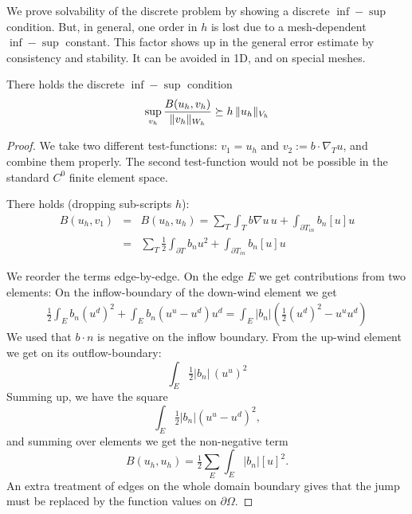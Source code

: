 We prove solvability of the discrete problem by showing a discrete
$\inf-\sup$ condition.  But, in general, one order in $h$ is lost due to a
mesh-dependent $\inf-\sup$ constant. This factor shows up in the
general error estimate by consistency and stability. It can be avoided
in 1D, and on special meshes. 

\begin{theorem} There holds the discrete $\inf-\sup$ condition
$$
\sup_{v_h} \frac{B(u_h, v_h)}{ \| v_h \|_{W_h}}  \succeq h \, \| u_h \|_{V_h}
$$
\end{theorem}
\begin{proof}
We take two different test-functions: $v_1 = u_h$ and $v_2 := b \cdot
\nabla_T u$, and combine them properly. The second test-function would not be possible in the
standard $C^0$ finite element space.

There holds (dropping sub-scripts $h$):
\begin{eqnarray*}
B(u_h, v_1) & = & B(u_h, u_h) = \sum_T \int_T b \nabla u \, u + \int_{\partial T_{in}}
  b_n [u] u \\
& = & \sum_T \frac{1}{2} \int_{\partial T} b_n u^2 + \int_{\partial T_{in}}
  b_n [u] u 
\end{eqnarray*}

We reorder the terms edge-by-edge. On the edge $E$ we get
contributions from two elements: On the inflow-boundary of the
down-wind element we get
\begin{eqnarray*}
\tfrac{1}{2} \int_E b_n (u^d)^2 + \int_E b_n (u^u - u^d) u^d = \int_E
  |b_n| \left( \tfrac{1}{2} (u^d)^2 - u^u u^d \right)
\end{eqnarray*}
We used that $b\cdot n$ is negative on the inflow boundary. From the
up-wind element we get on its outflow-boundary:
$$
\int_E \tfrac{1}{2} |b_n| \, (u^u)^2 
$$
Summing up, we have the square
$$
\int_E \tfrac{1}{2} | b_n |  (u^u  - u^d)^2,
$$
and summing over elements we get the non-negative term
$$
B(u_h, u_h) = \tfrac{1}{2} \sum_E \int_E |b_n| [u]^2.
$$
An extra treatment of edges on the whole domain boundary gives that
the jump must be  replaced by the function values on $\partial \Omega$.


\end{proof}
